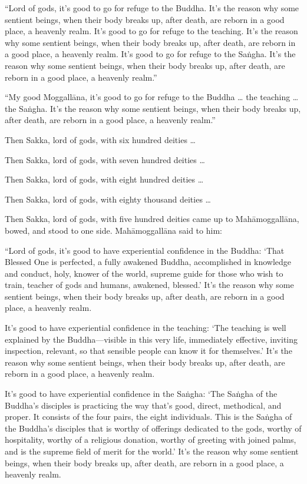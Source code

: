 \documentclass[12pt,openany]{book}%
\begin{document}
“Lord of gods, it’s good to go for refuge to the Buddha. It’s the reason why some sentient beings, when their body breaks up, after death, are reborn in a good place, a heavenly realm. It’s good to go for refuge to the teaching. It’s the reason why some sentient beings, when their body breaks up, after death, are reborn in a good place, a heavenly realm. It’s good to go for refuge to the \textsanskrit{Saṅgha}. It’s the reason why some sentient beings, when their body breaks up, after death, are reborn in a good place, a heavenly realm.” 

“My good \textsanskrit{Moggallāna}, it’s good to go for refuge to the Buddha … the teaching … the \textsanskrit{Saṅgha}. It’s the reason why some sentient beings, when their body breaks up, after death, are reborn in a good place, a heavenly realm.” 

Then Sakka, lord of gods, with six hundred deities … 

Then Sakka, lord of gods, with seven hundred deities … 

Then Sakka, lord of gods, with eight hundred deities … 

Then Sakka, lord of gods, with eighty thousand deities … 

Then Sakka, lord of gods, with five hundred deities came up to \textsanskrit{Mahāmoggallāna}, bowed, and stood to one side. \textsanskrit{Mahāmoggallāna} said to him: 

“Lord of gods, it’s good to have experiential confidence in the Buddha: ‘That Blessed One is perfected, a fully awakened Buddha, accomplished in knowledge and conduct, holy, knower of the world, supreme guide for those who wish to train, teacher of gods and humans, awakened, blessed.’ It’s the reason why some sentient beings, when their body breaks up, after death, are reborn in a good place, a heavenly realm. 

It’s good to have experiential confidence in the teaching: ‘The teaching is well explained by the Buddha—visible in this very life, immediately effective, inviting inspection, relevant, so that sensible people can know it for themselves.’ It’s the reason why some sentient beings, when their body breaks up, after death, are reborn in a good place, a heavenly realm. 

It’s good to have experiential confidence in the \textsanskrit{Saṅgha}: ‘The \textsanskrit{Saṅgha} of the Buddha’s disciples is practicing the way that’s good, direct, methodical, and proper. It consists of the four pairs, the eight individuals. This is the \textsanskrit{Saṅgha} of the Buddha’s disciples that is worthy of offerings dedicated to the gods, worthy of hospitality, worthy of a religious donation, worthy of greeting with joined palms, and is the supreme field of merit for the world.’ It’s the reason why some sentient beings, when their body breaks up, after death, are reborn in a good place, a heavenly realm. 
\end{document}
